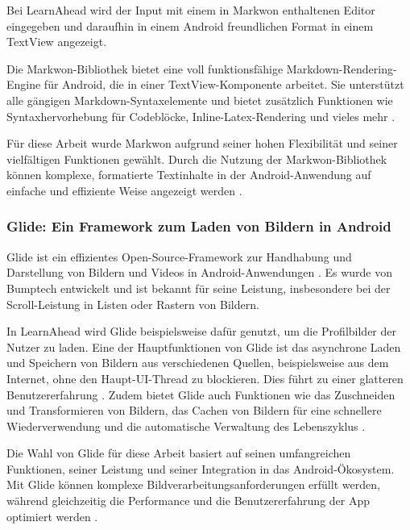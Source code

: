 \noindent
Bei LearnAhead wird der Input mit einem in Markwon enthaltenen Editor eingegeben und daraufhin in einem Android freundlichen Format in einem TextView angezeigt. \newline

\noindent
Die Markwon-Bibliothek bietet eine voll funktionsfähige Markdown-Rendering-Engine für Android, die in einer TextView-Komponente arbeitet. Sie unterstützt alle gängigen Markdown-Syntaxelemente und bietet zusätzlich Funktionen wie Syntaxhervorhebung für Codeblöcke, Inline-Latex-Rendering und vieles mehr \cite{Markwon2022}. \newline

\noindent
Für diese Arbeit wurde Markwon aufgrund seiner hohen Flexibilität und seiner vielfältigen Funktionen gewählt. Durch die Nutzung der Markwon-Bibliothek können komplexe, formatierte Textinhalte in der Android-Anwendung auf einfache und effiziente Weise angezeigt werden \cite{Markwon2022}.

\subsubsection{Glide: Ein Framework zum Laden von Bildern in Android}
Glide ist ein effizientes Open-Source-Framework zur Handhabung und Darstellung von Bildern und Videos in Android-Anwendungen \cite{Glide2022}. Es wurde von Bumptech entwickelt und ist bekannt für seine Leistung, insbesondere bei der Scroll-Leistung in Listen oder Rastern von Bildern. \newline

\noindent
In LearnAhead wird Glide beispielsweise dafür genutzt, um die Profilbilder der Nutzer zu laden. Eine der Hauptfunktionen von Glide ist das asynchrone Laden und Speichern von Bildern aus verschiedenen Quellen, beispielsweise aus dem Internet, ohne den Haupt-\ac*{UI}-Thread zu blockieren. Dies führt zu einer glatteren Benutzererfahrung \cite{Glide2022}. Zudem bietet Glide auch Funktionen wie das Zuschneiden und Transformieren von Bildern, das Cachen von Bildern für eine schnellere Wiederverwendung und die automatische Verwaltung des Lebenszyklus \cite{GlideGithub2022}. \newline

\noindent
Die Wahl von Glide für diese Arbeit basiert auf seinen umfangreichen Funktionen, seiner Leistung und seiner Integration in das Android-Ökosystem. Mit Glide können komplexe Bildverarbeitungsanforderungen erfüllt werden, während gleichzeitig die Performance und die Benutzererfahrung der App optimiert werden \cite{Glide2022}.

